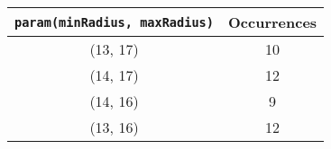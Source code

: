 \documentclass[letterpaper, 12pt]{article}
\begin{document}
\begin{longtable}{|c|c|}
\hline
\textbf{\texttt{param(minRadius, maxRadius)}} & \textbf{Occurrences} \\
\hline
(13, 17) & 10 \\
\hline
(14, 17) & 12 \\
\hline
(14, 16) & 9 \\
\hline
(13, 16) & 12 \\
\hline
\end{longtable}
\end{document}
